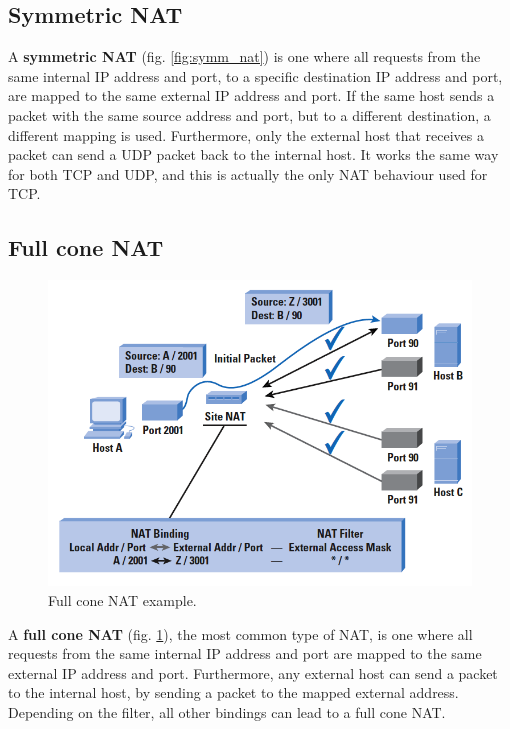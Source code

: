 \subsection{Symmetric NAT}
A \textbf{symmetric NAT} (fig. \ref{fig:symm_nat}) is one where all requests from the same internal IP address and port, to a specific destination IP address and port, are mapped to the same external IP address and port. If the same host sends a packet with the same source address and port, but to a different destination, a different mapping is used. Furthermore, only the external host that receives a packet can send a UDP packet back to the internal host. It works the same way for both TCP and UDP, and this is actually the only NAT behaviour used for TCP.

\subsection{Full cone NAT}
\begin{figure}[h]
    \centering
    \includegraphics[scale=0.6]{img/full_cone_nat.png}
    \decoRule
    \caption{Full cone NAT example.}
    \label{fig:full_cone_nat}
\end{figure}

A \textbf{full cone NAT} (fig. \ref{fig:full_cone_nat}), the most common type of NAT, is one where all requests from the same internal IP address and port are mapped to the same external IP address and port. Furthermore, any external host can send a packet to the internal host, by sending a packet to the mapped external address. Depending on the filter, all other bindings can lead to a full cone NAT.

